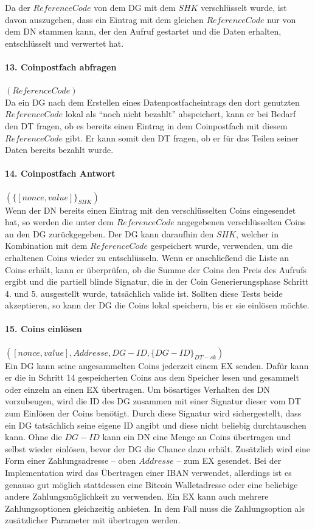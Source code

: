 \documentclass[
	fontsize=11pt,
	headings=small,
	parskip=half,           %
	bibliography=totoc,
	numbers=noenddot,       %
	open=any,               %
]{scrreprt}
\begin{document}
Da der $ReferenceCode$ von dem DG mit dem $SHK$ verschlüsselt wurde, ist davon auszugehen, dass ein Eintrag mit dem gleichen $ReferenceCode$ nur von dem DN stammen kann, der den Aufruf gestartet und die Daten erhalten, entschlüsselt und verwertet hat.

\paragraph{13. Coinpostfach abfragen} $(ReferenceCode)$\\
Da ein DG nach dem Erstellen eines Datenpostfacheintrags den dort genutzten $ReferenceCode$ lokal als ``noch nicht bezahlt'' abspeichert, kann er bei Bedarf den DT fragen, ob es bereits einen Eintrag in dem Coinpostfach mit diesem $ReferenceCode$ gibt. Er kann somit den DT fragen, ob er für das Teilen seiner Daten bereits bezahlt wurde.

\paragraph{14. Coinpostfach Antwort} $(\{[nonce,value]\}_{SHK})$\\
Wenn der DN bereits einen Eintrag mit den verschlüsselten Coins eingesendet hat, so werden die unter dem $ReferenceCode$ angegebenen verschlüsselten Coins an den DG zurückgegeben. Der DG kann daraufhin den $SHK$, welcher in Kombination mit dem $ReferenceCode$ gespeichert wurde, verwenden, um die erhaltenen Coins wieder zu entschlüsseln. Wenn er anschließend die Liste an Coins erhält, kann er überprüfen, ob die Summe der Coins den Preis des Aufrufs ergibt und die partiell blinde Signatur, die in der Coin Generierungsphase Schritt 4. und 5. ausgestellt wurde, tatsächlich valide ist. Sollten diese Tests beide akzeptieren, so kann der DG die Coins lokal speichern, bis er sie einlösen möchte.

\paragraph{15. Coins einlösen} $([nonce,value], Addresse, DG-ID, \{DG-ID\}_{DT-sk})$\\
Ein DG kann seine angesammelten Coins jederzeit einem EX senden. Dafür kann er die in Schritt 14 gespeicherten Coins aus dem Speicher lesen und gesammelt oder einzeln an einen EX übertragen. Um bösartiges Verhalten des DN vorzubeugen, wird die ID des DG zusammen mit einer Signatur dieser vom DT zum Einlösen der Coins benötigt. Durch diese Signatur wird sichergestellt, dass ein DG tatsächlich seine eigene ID angibt und diese nicht beliebig durchtauschen kann. Ohne die $DG-ID$ kann ein DN eine Menge an Coins übertragen und selbst wieder einlösen, bevor der DG die Chance dazu erhält. Zusätzlich wird eine Form einer Zahlungsadresse -- oben $Addresse$ -- zum EX gesendet. Bei der Implementation wird das Übertragen einer IBAN verwendet, allerdings ist es genauso gut möglich stattdessen eine Bitcoin Walletadresse oder eine beliebige andere Zahlungsmöglichkeit zu verwenden. Ein EX kann auch mehrere Zahlungsoptionen gleichzeitig anbieten. In dem Fall muss die Zahlungsoption als zusätzlicher Parameter mit übertragen werden.
\end{document}
